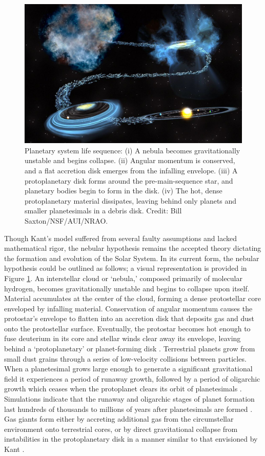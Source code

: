 \documentclass[12pt,oneside]{book}
\begin{document}
\begin{figure}[!ht]
  \includegraphics[width=\linewidth]{../figures/disk_evolution}
  \caption{Planetary system life sequence: (i) A nebula becomes gravitationally unstable and begins collapse. (ii) Angular momentum is conserved, and a flat accretion disk emerges from the infalling envelope. (iii) A protoplanetary disk forms around the pre-main-sequence star, and planetary bodies begin to form in the disk. (iv) The hot, dense protoplanetary material dissipates, leaving behind only planets and smaller planetesimals in a debris disk. Credit: Bill Saxton/NSF/AUI/NRAO.}
  \label{fig: evolution}
\end{figure}

Though Kant's model suffered from several faulty assumptions and lacked mathematical rigor, the nebular hypothesis remains the accepted theory dictating the formation and evolution of the Solar System.
In its current form, the nebular hypothesis could be outlined as follows; a visual representation is provided in Figure \ref{fig: evolution}.
An interstellar cloud or `nebula,' composed primarily of molecular hydrogen, becomes gravitationally unstable and begins to collapse upon itself.
Material accumulates at the center of the cloud, forming a dense protostellar core enveloped by infalling material.
Conservation of angular momentum causes the protostar's envelope to flatten into an accretion disk that deposits gas and dust onto the protostellar surface.
Eventually, the protostar becomes hot enough to fuse deuterium in its core and stellar winds clear away its envelope, leaving behind a `protoplanetary' or planet-forming disk \citep{shu87}.
Terrestrial planets grow from small dust grains through a series of low-velocity collisions between particles. 
When a planetesimal grows large enough to generate a significant gravitational field it experiences a period of runaway growth, followed by a period of oligarchic growth which ceases when the protoplanet clears its orbit of planetesimals \citep{chambers_exo}.
Simulations indicate that the runaway and oligarchic stages of planet formation last hundreds of thousands to millions of years after planetesimals are formed \citep{wetherill&stewart93,kokubo00}.
Gas giants form either by accreting additional gas from the circumstellar environment onto terrestrial cores, or by direct gravitational collapse from instabilities in the protoplanetary disk in a manner similar to that envisioned by Kant \citep{d'angelo10}.
\end{document}
